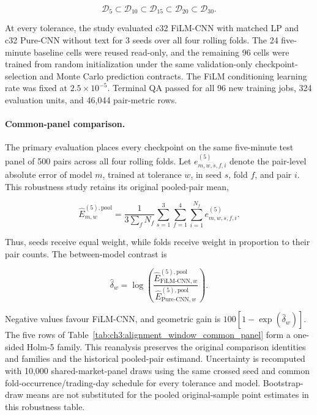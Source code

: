 \[
\mathcal D_{5}
\subset
\mathcal D_{10}
\subset
\mathcal D_{15}
\subset
\mathcal D_{20}
\subset
\mathcal D_{30}.
\]

At every tolerance, the study evaluated c32 FiLM-CNN with matched LP and c32
Pure-CNN without text for 3 seeds over all four rolling folds. The 24 five-minute baseline cells were reused read-only, and the remaining 96
cells were trained from random initialization under the same validation-only
checkpoint-selection and Monte Carlo prediction contracts. The FiLM
conditioning learning rate was fixed at $2.5\times10^{-5}$. Terminal QA passed
for all 96 new training jobs, 324 evaluation units, and 46,044 pair-metric
rows.

\paragraph*{Common-panel comparison.}
The primary evaluation places every checkpoint on the same five-minute test
panel of 500 pairs across all four rolling folds. Let
$e^{(5)}_{m,w,s,f,i}$ denote the pair-level absolute error of model $m$,
trained at tolerance $w$, in seed $s$, fold $f$, and pair $i$.  This
robustness study retains its original pooled-pair mean,

\[
\widehat E^{(5),\mathrm{pool}}_{m,w}
=
\frac{1}{3\sum_f N_f}
\sum_{s=1}^{3}\sum_{f=1}^{4}\sum_{i=1}^{N_f}
e^{(5)}_{m,w,s,f,i}.
\]

Thus, seeds receive equal weight, while folds receive weight in proportion to
their pair counts. The between-model contrast is

\[
\widehat{\delta}_{w}
=
\log\!\left(
\frac{\widehat E^{(5),\mathrm{pool}}_{\mathrm{FiLM\text{-}CNN},w}}
     {\widehat E^{(5),\mathrm{pool}}_{\mathrm{Pure\text{-}CNN},w}}
\right).
\]

Negative values favour FiLM-CNN, and geometric gain is
$100[1-\exp(\widehat{\delta}_{w})]$. The five rows of
Table~\ref{tab:ch3:alignment_window_common_panel} form a one-sided Holm-5
family. This reanalysis preserves the original comparison identities and
families and the historical pooled-pair estimand.
Uncertainty is recomputed with 10,000 shared-market-panel draws using the
same crossed seed and common fold-occurrence/trading-day schedule for every
tolerance and model. Bootstrap-draw means are not substituted for the pooled
original-sample point estimates in this robustness table.

